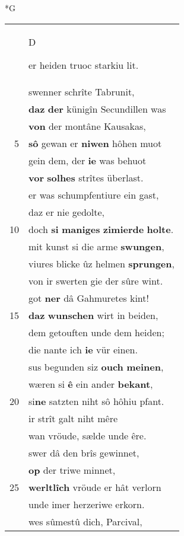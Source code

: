 \documentclass[8pt,a4paper,notitlepage]{article}
\begin{document}
\begin{table}[ht]
\begin{minipage}[t]{0.5\linewidth}
\small
\begin{center}*G
\end{center}
\begin{tabular}{rl}
 & \begin{large}D\end{large}er heiden truoc starkiu lit.\\ 
 & swenner schrîte Tabrunit,\\ 
 & \textbf{daz} \textbf{der} künigîn Secundillen was\\ 
 & \textbf{von} der montâne Kausakas,\\ 
5 & \textbf{sô} gewan er \textbf{niwen} hôhen muot\\ 
 & gein dem, der \textbf{ie} was behuot\\ 
 & \textbf{vor} \textbf{solhes} strîtes überlast.\\ 
 & er was schumpfentiure ein gast,\\ 
 & daz er nie gedolte,\\ 
10 & doch \textbf{si} \textbf{maniges} \textbf{zimierde} \textbf{holte}.\\ 
 & mit kunst si die arme \textbf{swungen},\\ 
 & viures blicke ûz helmen \textbf{sprungen},\\ 
 & von ir swerten gie der sûre wint.\\ 
 & got \textbf{ner} dâ Gahmuretes kint!\\ 
15 & \textbf{daz} \textbf{wunschen} wirt in beiden,\\ 
 & dem getouften unde dem heiden;\\ 
 & die nante ich \textbf{ie} vür einen.\\ 
 & sus begunden siz \textbf{ouch} \textbf{meinen},\\ 
 & wæren si \textbf{ê} ein ander \textbf{bekant},\\ 
20 & si\textbf{ne} satzten niht sô hôhiu pfant.\\ 
 & ir strît galt niht mêre\\ 
 & wan vröude, sælde unde êre.\\ 
 & swer dâ den brîs gewinnet,\\ 
 & \textbf{op} der triwe minnet,\\ 
25 & \textbf{werltlîch} vröude er hât verlorn\\ 
 & unde imer herzeriwe erkorn.\\ 
 & wes sûmestû dich, Parcival,\\ 

\end{tabular}
\end{minipage}
\end{table}
\end{document}
